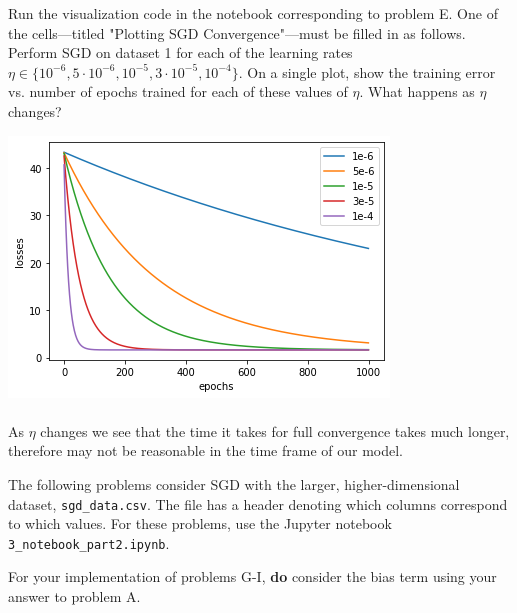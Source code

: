 \begin{problem}[6]
  Run the visualization code in the notebook corresponding to problem E. One of the cells---titled "Plotting SGD Convergence"---must be filled in as follows. Perform SGD on dataset 1 for each of the learning rates $\eta \in \{10^{-6}, 5 \cdot 10^{-6}, 10^{-5}, 3 \cdot 10^{-5}, 10^{-4}\}$. On a single plot, show the training error vs. number of epochs trained for each of these values of $\eta$. What happens as $\eta$ changes?
\end{problem}

\begin{solution}
\includegraphics{set1/images/Unknown-10.png}\\ 
\\
As $\eta$ changes we see that the time it takes for full convergence takes much longer, therefore may not be reasonable in the time frame of our model.
\end{solution}


The following problems consider SGD with the larger, higher-dimensional dataset, \texttt{sgd_data.csv}. The file has a header denoting which columns correspond to which values. For these problems, use the Jupyter notebook \texttt{3_notebook_part2.ipynb}.

For your implementation of problems G-I, \textbf{do} consider the bias term using your answer to problem A.

